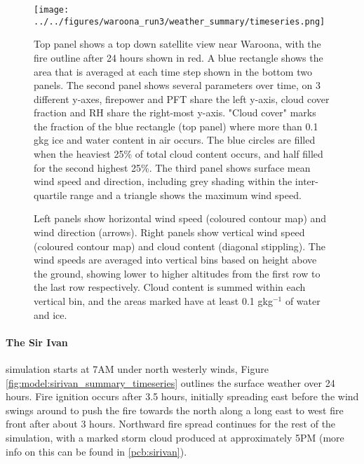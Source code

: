     \begin{figure}
      \texttt{[image: ../../figures/waroona\_run3/weather\_summary/timeseries.png]}
      \caption{%
        Top panel shows a top down satellite view near Waroona, with the fire outline after 24 hours shown in red. A blue rectangle shows the area that is averaged at each time step shown in the bottom two panels.
        The second panel shows several parameters over time, on 3 different y-axes, firepower and PFT share the left y-axis, cloud cover fraction and RH share the right-most y-axis.
        "Cloud cover" marks the fraction of the blue rectangle (top panel) where more than 0.1 g\/kg ice and water content in air occurs. 
        The blue circles are filled when the heaviest 25\% of total cloud content occurs, and half filled for the second highest 25\%.
        The third panel shows surface mean wind speed and direction, including grey shading within the inter-quartile range and a triangle shows the maximum wind speed.
        }
      \label{fig:model:waroona_summary_timeseries}
    \end{figure}
    
    \begin{figure}
      \caption{Left panels show horizontal wind speed (coloured contour map) and wind direction (arrows).
      Right panels show vertical wind speed (coloured contour map) and cloud content (diagonal stippling).
      The wind speeds are averaged into vertical bins based on height above the ground, showing lower to higher altitudes from the first row to the last row respectively.
      Cloud content is summed within each vertical bin, and the areas marked have at least 0.1 gkg$^{-1}$ of water and ice.}
      \label{fig:model:weather_summary_updraught}
    \end{figure}
    
    \paragraph{The Sir Ivan} simulation starts at 7AM under north westerly winds, Figure \ref{fig:model:sirivan_summary_timeseries} outlines the surface weather over 24 hours.
    Fire ignition occurs after 3.5 hours, initially spreading east before the wind swings around to push the fire towards the north along a long east to west fire front after about 3 hours. 
    Northward fire spread continues for the rest of the simulation, with a marked storm cloud produced at approximately 5PM (more info on this can be found in \ref{pcb:sirivan}).
    
